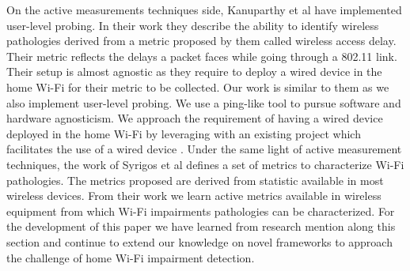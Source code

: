 On the active measurements techniques side, Kanuparthy et al \cite{can_user_level_probing} have implemented user-level probing. In their work they describe the ability to identify wireless pathologies derived from a metric proposed by them called wireless access delay. Their metric reflects the delays a packet faces while going through a 802.11 link. Their setup is almost agnostic as they require to deploy a wired device in the home Wi-Fi for their metric to be collected. Our work is similar to them as we also implement user-level probing. We use a ping-like tool to pursue software and hardware agnosticism. We approach the requirement of having a wired device deployed in the home Wi-Fi by leveraging with an existing project which facilitates the use of a wired device \cite{hostview}. Under the same light of active measurement techniques, the work of Syrigos et al \cite{WLAN_Troubleshooting} defines a set of metrics to characterize Wi-Fi pathologies. The metrics proposed are derived from statistic available in most wireless devices. From their work we learn active metrics available in wireless equipment from which Wi-Fi impairments pathologies can be characterized. For the development of this paper we have learned from research mention along this section and continue to extend our knowledge on novel frameworks to approach the challenge of home Wi-Fi impairment detection.

